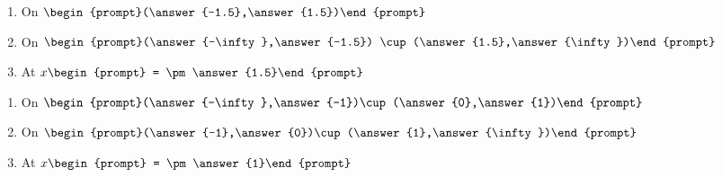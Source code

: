 \documentclass{ximera}
\begin{document}
\begin{exercise}
\noindent\begin{minipage}[t]{.49\linewidth}
\begin{enumerate}
\item		On $\begin{prompt}(\answer{-1.5},\answer{1.5})\end{prompt}$
\item		On $\begin{prompt}(\answer{-\infty},\answer{-1.5}) \cup (\answer{1.5},\answer{\infty})\end{prompt}$
\item		At $x\begin{prompt} = \pm\answer{1.5}\end{prompt}$
\end{enumerate}
\end{minipage}
\begin{minipage}[t]{.49\linewidth}
\begin{enumerate}\addtocounter{enumi}{3}
\item		On $\begin{prompt}(\answer{-\infty},\answer{-1})\cup(\answer{0},\answer{1})\end{prompt}$
\item		On $\begin{prompt}(\answer{-1},\answer{0})\cup(\answer{1},\answer{\infty})\end{prompt}$
\item		At $x\begin{prompt} = \pm\answer{1}\end{prompt}$
\end{enumerate}
\end{minipage}

\end{exercise}
\end{document}
